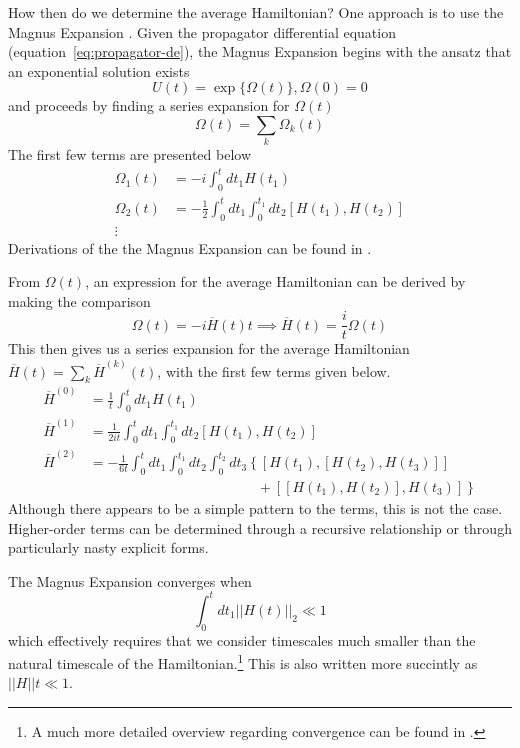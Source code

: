 How then do we determine the average Hamiltonian? One approach is to use the Magnus Expansion \cite{Blanes_2009,2010EJPh...31..907B}. Given the propagator differential equation (equation~\ref{eq:propagator-de}), the Magnus Expansion begins with the ansatz that an exponential solution exists
\[
U(t) = \exp\{\Omega(t)\}, \Omega(0) = 0
\]
and proceeds by finding a series expansion for $\Omega(t)$
\[
\Omega(t) = \sum_k \Omega_k(t)
\]
The first few terms are presented below
\begin{align*}
    \Omega_1(t) &= -i \int_0^t dt_1 H(t_1) \\
    \Omega_2(t) &= -\frac{1}{2} \int_0^t dt_1 \int_0^{t_1} dt_2 [H(t_1), H(t_2)] \\
    \vdots
\end{align*}
Derivations of the the Magnus Expansion can be found in
\cite{gerstein-dybowski,Blanes_2009,2010EJPh...31..907B}.

From $\Omega(t)$, an expression for the average Hamiltonian can be derived by making the comparison
\[
\Omega(t) = -i \overline{H}(t) t \implies \overline{H}(t) = \frac{i}{t} \Omega(t)
\]
This then gives us a series expansion for the average Hamiltonian $\overline{H}(t) = \sum_k \overline{H}^{(k)}(t)$, with the first few terms given below.
\begin{align}
    \label{eq:AHT-term-0}
    \overline{H}^{(0)} &= \frac{1}{t} \int_0^{t} dt_1 H(t_1) \\
    \label{eq:AHT-term-1}
    \overline{H}^{(1)} &= \frac{1}{2it} \int_0^{t} dt_1 \int_0^{t_1} dt_2
        \left[H(t_1), H(t_2)\right] \\
    \label{eq:AHT-term-2}
    \overline{H}^{(2)} &= -\frac{1}{6t}
    \int_0^{t} dt_1 \int_0^{t_1} dt_2 \int_0^{t_2} dt_3
    \left\{
    \left[H(t_1), \left[H(t_2), H(t_3)\right]\right] \right. \\
    & \hspace{12em} + \left.
    \left[\left[H(t_1), H(t_2)\right], H(t_3)\right]
    \right\}
\end{align}
Although there appears to be a simple pattern to the terms, this is not the case. Higher-order terms can be determined through a recursive relationship or through particularly nasty explicit forms.

The Magnus Expansion converges when
\begin{equation}\label{eq:AHT-convergence}
    \int_0^t dt_1 ||H(t)||_2 \ll 1
\end{equation}
which effectively requires that we consider timescales much smaller than the natural timescale of the Hamiltonian.\footnote{A much more detailed overview regarding convergence can be found in \cite{Blanes_2009}.} This is also written more succintly as $||H||t \ll 1$.


